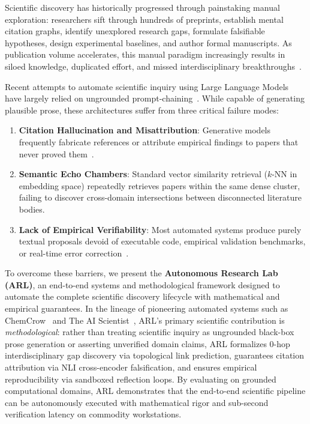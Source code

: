 \documentclass[10pt,twocolumn,letterpaper]{article}
\begin{document}
Scientific discovery has historically progressed through painstaking manual exploration: researchers sift through hundreds of preprints, establish mental citation graphs, identify unexplored research gaps, formulate falsifiable hypotheses, design experimental baselines, and author formal manuscripts. As publication volume accelerates, this manual paradigm increasingly results in siloed knowledge, duplicated effort, and missed interdisciplinary breakthroughs~\cite{lu2024aiscientist}.

Recent attempts to automate scientific inquiry using Large Language Models have largely relied on ungrounded prompt-chaining~\cite{bran2023chemcrow}. While capable of generating plausible prose, these architectures suffer from three critical failure modes:
\begin{enumerate}
    \item \textbf{Citation Hallucination and Misattribution}: Generative models frequently fabricate references or attribute empirical findings to papers that never proved them~\cite{edge2024graphrag}.
    \item \textbf{Semantic Echo Chambers}: Standard vector similarity retrieval ($k$-NN in embedding space) repeatedly retrieves papers within the same dense cluster, failing to discover cross-domain intersections between disconnected literature bodies.
    \item \textbf{Lack of Empirical Verifiability}: Most automated systems produce purely textual proposals devoid of executable code, empirical validation benchmarks, or real-time error correction~\cite{shinn2023reflexion}.
\end{enumerate}

To overcome these barriers, we present the \textbf{Autonomous Research Lab (ARL)}, an end-to-end systems and methodological framework designed to automate the complete scientific discovery lifecycle with mathematical and empirical guarantees. In the lineage of pioneering automated systems such as ChemCrow~\cite{bran2023chemcrow} and The AI Scientist~\cite{lu2024aiscientist}, ARL's primary scientific contribution is \textit{methodological}: rather than treating scientific inquiry as ungrounded black-box prose generation or asserting unverified domain claims, ARL formalizes 0-hop interdisciplinary gap discovery via topological link prediction, guarantees citation attribution via NLI cross-encoder falsification, and ensures empirical reproducibility via sandboxed reflection loops. By evaluating on grounded computational domains, ARL demonstrates that the end-to-end scientific pipeline can be autonomously executed with mathematical rigor and sub-second verification latency on commodity workstations.
\end{document}
